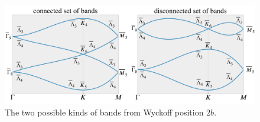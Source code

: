 \begin{figure}[H]
\centering
\includegraphics[width=\linewidth]{fig/bands_con_discon.png}
\caption{The two possible kinds of bands from Wyckoff position $2b$.}
\label{fig:bands_con_discon}
\end{figure}







%



